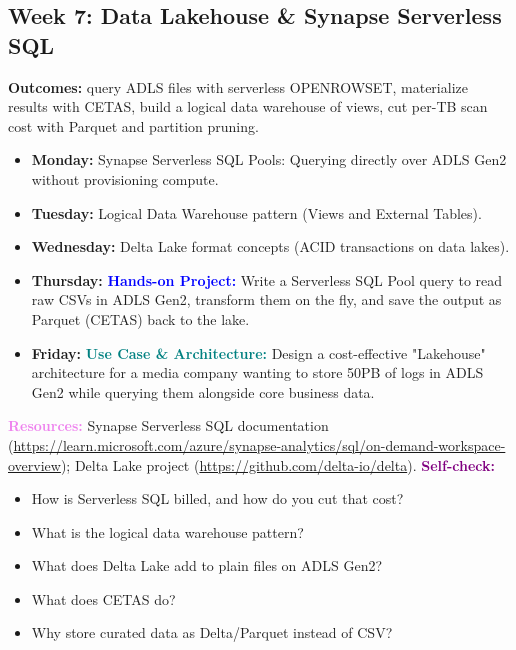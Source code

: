 \documentclass[11pt, a4paper]{article}
\newcommand{\project}[1]{\vspace{1mm}\noindent\textbf{\textcolor{blue}{Hands-on Project:}} #1}
\newcommand{\usecase}[1]{\vspace{1mm}\noindent\textbf{\textcolor{teal}{Use Case \& Architecture:}} #1}
\newcommand{\dayitem}[2]{\item \textbf{#1:} #2}
\newcommand{\resources}[1]{\vspace{1mm}\noindent\textbf{\textcolor{violet}{Resources:}} #1}
\newcommand{\selfcheck}[1]{\vspace{1mm}\noindent\textbf{\textcolor{purple}{Self-check:}} #1}
\begin{document}
\subsection*{Week 7: Data Lakehouse \& Synapse Serverless SQL}
\par\noindent\textbf{Outcomes:} query ADLS files with serverless OPENROWSET, materialize results with CETAS, build a logical data warehouse of views, cut per-TB scan cost with Parquet and partition pruning.
\begin{itemize}[label=-]
    \dayitem{Monday}{Synapse Serverless SQL Pools: Querying directly over ADLS Gen2 without provisioning compute.}
    \dayitem{Tuesday}{Logical Data Warehouse pattern (Views and External Tables).}
    \dayitem{Wednesday}{Delta Lake format concepts (ACID transactions on data lakes).}
    \dayitem{Thursday}{\project{Write a Serverless SQL Pool query to read raw CSVs in ADLS Gen2, transform them on the fly, and save the output as Parquet (CETAS) back to the lake.}}
    \dayitem{Friday}{\usecase{Design a cost-effective "Lakehouse" architecture for a media company wanting to store 50PB of logs in ADLS Gen2 while querying them alongside core business data.}}
\end{itemize}
\resources{Synapse Serverless SQL documentation (\url{https://learn.microsoft.com/azure/synapse-analytics/sql/on-demand-workspace-overview}); Delta Lake project (\url{https://github.com/delta-io/delta}).}
\selfcheck{\begin{itemize}[label=-, itemsep=0pt]
    \item How is Serverless SQL billed, and how do you cut that cost?
    \item What is the logical data warehouse pattern?
    \item What does Delta Lake add to plain files on ADLS Gen2?
    \item What does CETAS do?
    \item Why store curated data as Delta/Parquet instead of CSV?
\end{itemize}}
\end{document}
